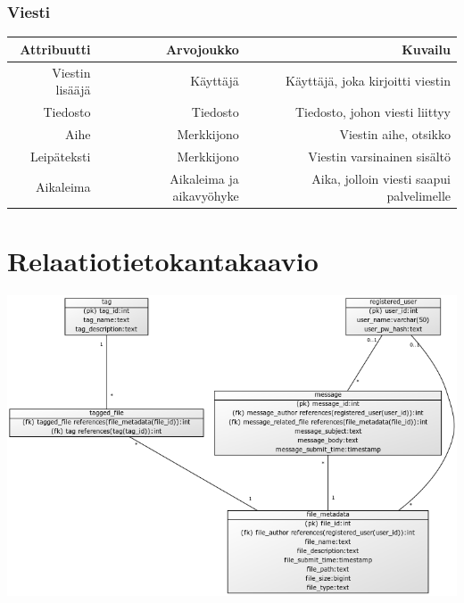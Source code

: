\documentclass[10pt,a4paper]{article}
\begin{document}
\subsubsection{Viesti}
\begin{tabularx}{\textwidth}{|R|R|R|} \hline
\textbf{Attribuutti} & \textbf{Arvojoukko} & \textbf{Kuvailu}\\ \hline
Viestin lisääjä & Käyttäjä & Käyttäjä, joka kirjoitti viestin\\ \hline
Tiedosto & Tiedosto & Tiedosto, johon viesti liittyy\\ \hline
Aihe & Merkkijono & Viestin aihe, otsikko\\ \hline
Leipäteksti & Merkkijono & Viestin varsinainen sisältö\\ \hline
Aikaleima & Aikaleima ja aikavyöhyke & Aika, jolloin viesti saapui palvelimelle\\ \hline
\end{tabularx}

\section{Relaatiotietokantakaavio}
\includegraphics[scale=0.5]{kaaviot/tietokantakaavio.png}
\end{document}
